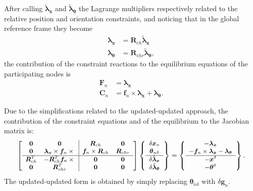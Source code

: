 \documentclass[10pt,dvips,fleqn,subeqn]{report}
\newcommand{\T}[1]{\bm{#1}}
\begin{document}
After calling $\tilde{\T{\lambda}}_{\T{x}}$
and $\tilde{\T{\lambda}}_{\T{\theta}}$ the Lagrange multipliers
respectively related to the relative position and orientation
constraints, and noticing that in the global reference frame
they become
\begin{subequations}
\begin{align}
	\T{\lambda}_{\T{x}} &= \T{R}_{ch} \tilde{\T{\lambda}}_{\T{x}} \\
	\T{\lambda}_{\T{\theta}} &= \T{R}_{chr} \tilde{\T{\lambda}}_{\T{\theta}} ,
\end{align}
\end{subequations}
the contribution of the constraint reactions to the equilibrium equations
of the participating nodes is
\begin{subequations}
\begin{align}
	\T{F}_n &= \T{\lambda}_{\T{x}} \\
	\T{C}_n &= \T{f}_n \times \T{\lambda}_{\T{x}} + \T{\lambda}_{\T{\theta}} .
\end{align}
\end{subequations}

Due to the simplifications related to the updated-updated approach,
the contribution of the constraint equations and of the equilibrium 
to the Jacobian matrix is: 
\begin{equation}
	\small
	\sqbr{\matr{cc|cc}{
	\T{0} &
	\T{0} &
	\T{R}_{ch} &
	\T{0} \\
	\T{0} &
	\T{\lambda}_{\T{x}}\times\T{f}_n\times{} &
	\T{f}_n\times\T{R}_{ch} & 
	\T{R}_{chr} \\
	\hline
	\T{R}_{ch}^T &
	-\T{R}_{ch}^T\T{f}_n\times{} & 
	\T{0} &
	\T{0} \\
	\T{0} &
	\T{R}_{chr}^T &
	\T{0} & 
	\T{0}
	}} \cubr{\cvvect{
		\delta\T{x}_n \\
		\T{\theta}_{n\delta} \\
		\hline
		\delta\tilde{\T{\lambda}}_{\T{x}} \\
		\delta\tilde{\T{\lambda}}_{\T{\theta}}
	}}
	= \cubr{\cvvect{
	- \T{\lambda}_{\T{x}} \\
	- \T{f}_n \times \T{\lambda}_{\T{x}} - \T{\lambda}_{\T{\theta}} \\
	\hline
	- \T{x}^{\delta} \\
	- \T{\theta}^{\delta}
	}} .
\end{equation}
The updated-updated form is obtained by simply replacing
$\T{\theta}_{n\delta}$ with $\delta\T{g}_n$.
\end{document}
